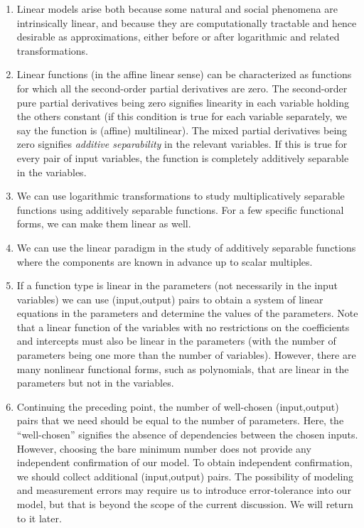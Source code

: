 \documentclass[10pt]{amsart}
\begin{document}
\begin{enumerate}
\item Linear models arise both because some natural and social
  phenomena are intrinsically linear, and because they are
  computationally tractable and hence desirable as approximations,
  either before or after logarithmic and related transformations.
\item Linear functions (in the affine linear sense) can be
  characterized as functions for which all the second-order partial
  derivatives are zero. The second-order pure partial derivatives
  being zero signifies linearity in each variable holding the others
  constant (if this condition is true for each variable separately, we
  say the function is (affine) multilinear). The mixed partial
  derivatives being zero signifies {\em additive separability} in the
  relevant variables. If this is true for every pair of input
  variables, the function is completely additively separable in the
  variables.
\item We can use logarithmic transformations to study multiplicatively
  separable functions using additively separable functions. For a few
  specific functional forms, we can make them linear as well.
\item We can use the linear paradigm in the study of additively
  separable functions where the components are known in advance up to
  scalar multiples.
\item If a function type is linear in the parameters (not necessarily
  in the input variables) we can use (input,output) pairs to obtain a
  system of linear equations in the parameters and determine the
  values of the parameters. Note that a linear function of the
  variables with no restrictions on the coefficients and intercepts
  must also be linear in the parameters (with the number of parameters
  being one more than the number of variables). However, there are
  many nonlinear functional forms, such as polynomials, that are
  linear in the parameters but not in the variables.
\item Continuing the preceding point, the number of well-chosen
  (input,output) pairs that we need should be equal to the number of
  parameters. Here, the ``well-chosen'' signifies the absence of
  dependencies between the chosen inputs. However, choosing the bare
  minimum number does not provide any independent confirmation of our
  model. To obtain independent confirmation, we should collect
  additional (input,output) pairs. The possibility of modeling and
  measurement errors may require us to introduce error-tolerance into
  our model, but that is beyond the scope of the current
  discussion. We will return to it later.
\end{enumerate}
\end{document}
